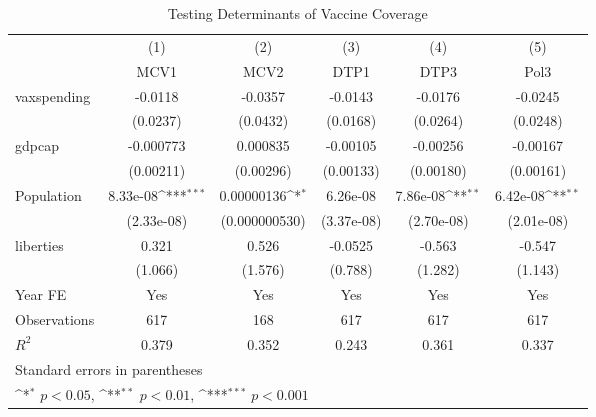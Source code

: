 \begin{table}[htbp]\centering
\def\sym#1{\ifmmode^{#1}\else\(^{#1}\)\fi}
\caption{Testing Determinants of Vaccine Coverage}
\begin{tabular}{l*{5}{c}}
\toprule
                &\multicolumn{1}{c}{(1)}&\multicolumn{1}{c}{(2)}&\multicolumn{1}{c}{(3)}&\multicolumn{1}{c}{(4)}&\multicolumn{1}{c}{(5)}\\
                &\multicolumn{1}{c}{MCV1}&\multicolumn{1}{c}{MCV2}&\multicolumn{1}{c}{DTP1}&\multicolumn{1}{c}{DTP3}&\multicolumn{1}{c}{Pol3}\\
\midrule
vaxspending     &  -0.0118         &  -0.0357         &  -0.0143         &  -0.0176         &  -0.0245         \\
                & (0.0237)         & (0.0432)         & (0.0168)         & (0.0264)         & (0.0248)         \\
\addlinespace
gdpcap          &-0.000773         & 0.000835         & -0.00105         & -0.00256         & -0.00167         \\
                &(0.00211)         &(0.00296)         &(0.00133)         &(0.00180)         &(0.00161)         \\
\addlinespace
Population      & 8.33e-08\sym{***}&0.00000136\sym{*}  & 6.26e-08         & 7.86e-08\sym{**} & 6.42e-08\sym{**} \\
                &(2.33e-08)         &(0.000000530)         &(3.37e-08)         &(2.70e-08)         &(2.01e-08)         \\
\addlinespace
liberties       &    0.321         &    0.526         &  -0.0525         &   -0.563         &   -0.547         \\
                &  (1.066)         &  (1.576)         &  (0.788)         &  (1.282)         &  (1.143)         \\
\addlinespace
Year FE         &      Yes         &      Yes         &      Yes         &      Yes         &      Yes         \\
\midrule
Observations    &      617         &      168         &      617         &      617         &      617         \\
\(R^{2}\)       &    0.379         &    0.352         &    0.243         &    0.361         &    0.337         \\
\bottomrule
\multicolumn{6}{l}{\footnotesize Standard errors in parentheses}\\
\multicolumn{6}{l}{\footnotesize \sym{*} \(p<0.05\), \sym{**} \(p<0.01\), \sym{***} \(p<0.001\)}\\
\end{tabular}
\end{table}
